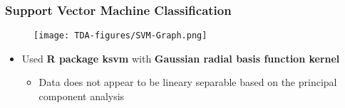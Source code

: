 \documentclass[aspectratio=169]{beamer}
\begin{document}
\begin{frame}
\frametitle{Support Vector Machine Classification} %

\vspace*{-6mm}
\begin{figure}[H]
\centering
  \texttt{[image: TDA-figures/SVM-Graph.png]}
\end{figure}

\vspace*{-2mm}
\begin{itemize}\justifying
\item Used {\bfseries \textcolor{UF_dark_blue}{R package ksvm}} with {\bfseries \textcolor{UF_dark_blue}{Gaussian radial basis function kernel}} 
	\begin{itemize}\justifying
	\item Data does not appear to be lineary separable based on the principal component analysis
	\end{itemize}
\end{itemize}

\end{frame}
\end{document}
